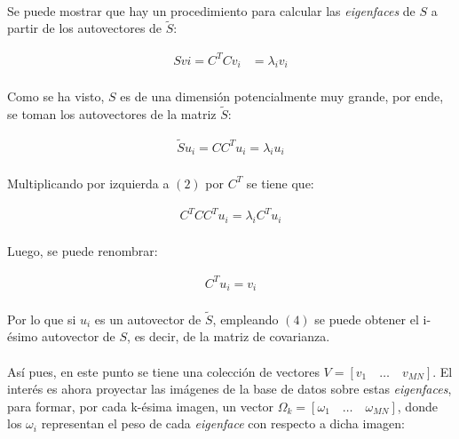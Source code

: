 \documentclass[12pt, twocolumn]{article}
\begin{document}
	\paragraph{} Se puede mostrar que hay un procedimiento para calcular las \textit{eigenfaces} de $S$ a partir de los autovectores de $\widetilde{S}$:
	
	\begin{align}
		Sv {i} = C^{T}Cv_{i} &= \lambda_{i}v_{i}
	\end{align}
	
	\paragraph{} Como se ha visto, $S$ es de una dimensión potencialmente muy grande, por ende, se toman los autovectores de la matriz $\widetilde{S}$:
	
	\begin{align}
		\widetilde{S}u_{i} = CC^{T}u_{i} = \lambda_{i}u_{i}
	\end{align}
	
	\paragraph{} Multiplicando por izquierda a $(2)$ por $C^{T}$ se tiene que:
	
	\begin{align}
		C^{T}CC^{T}u_{i} = \lambda_{i}C^{T}u_{i} 
	\end{align}
	
	\paragraph{} Luego, se puede renombrar:
	
	\begin{align}
		C^{T}u_{i} = v_{i}
	\end{align}
	
	\paragraph{} Por lo que si $u_{i}$ es un autovector de $\widetilde{S}$, empleando $(4)$ se puede obtener el i-ésimo autovector de $S$, es decir, de la matriz de covarianza. 
	
	\paragraph{} Así pues, en este punto se tiene una colección de vectores $V = \left[v_{1}\quad\dots\quad v_{MN}\right]$. El interés es ahora proyectar las imágenes de la base de datos sobre estas \textit{eigenfaces}, para formar, por cada k-ésima imagen, un vector $\Omega_{k} = \left[\omega_{1}\quad\dots\quad\omega_{MN}\right]$, donde los $\omega_{i}$ representan el peso de cada \textit{eigenface} con respecto a dicha imagen:
	
\end{document}
